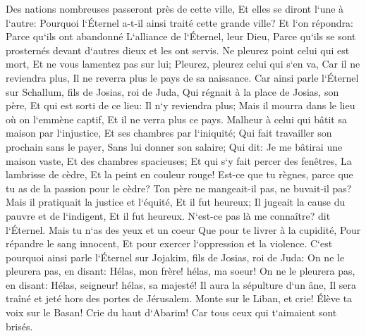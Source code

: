\verse Des nations nombreuses passeront près de cette ville, Et elles se diront l`une à l`autre: Pourquoi l`Éternel a-t-il ainsi traité cette grande ville? 
\verse Et l`on répondra: Parce qu`ils ont abandonné L`alliance de l`Éternel, leur Dieu, Parce qu`ils se sont prosternés devant d`autres dieux et les ont servis. 
\verse Ne pleurez point celui qui est mort, Et ne vous lamentez pas sur lui; Pleurez, pleurez celui qui s`en va, Car il ne reviendra plus, Il ne reverra plus le pays de sa naissance. 
\verse Car ainsi parle l`Éternel sur Schallum, fils de Josias, roi de Juda, Qui régnait à la place de Josias, son père, Et qui est sorti de ce lieu: Il n`y reviendra plus; 
\verse Mais il mourra dans le lieu où on l`emmène captif, Et il ne verra plus ce pays. 
\verse Malheur à celui qui bâtit sa maison par l`injustice, Et ses chambres par l`iniquité; Qui fait travailler son prochain sans le payer, Sans lui donner son salaire; 
\verse Qui dit: Je me bâtirai une maison vaste, Et des chambres spacieuses; Et qui s`y fait percer des fenêtres, La lambrisse de cèdre, Et la peint en couleur rouge! 
\verse Est-ce que tu règnes, parce que tu as de la passion pour le cèdre? Ton père ne mangeait-il pas, ne buvait-il pas? Mais il pratiquait la justice et l`équité, Et il fut heureux; 
\verse Il jugeait la cause du pauvre et de l`indigent, Et il fut heureux. N`est-ce pas là me connaître? dit l`Éternel. 
\verse Mais tu n`as des yeux et un coeur Que pour te livrer à la cupidité, Pour répandre le sang innocent, Et pour exercer l`oppression et la violence. 
\verse C`est pourquoi ainsi parle l`Éternel sur Jojakim, fils de Josias, roi de Juda: On ne le pleurera pas, en disant: Hélas, mon frère! hélas, ma soeur! On ne le pleurera pas, en disant: Hélas, seigneur! hélas, sa majesté! 
\verse Il aura la sépulture d`un âne, Il sera traîné et jeté hors des portes de Jérusalem. 
\verse Monte sur le Liban, et crie! Élève ta voix sur le Basan! Crie du haut d`Abarim! Car tous ceux qui t`aimaient sont brisés. 
